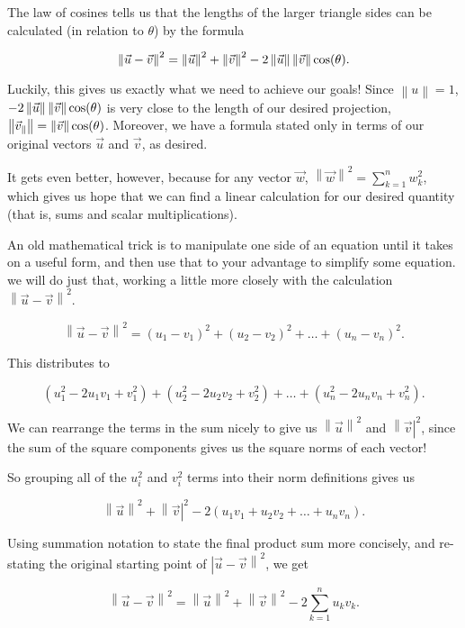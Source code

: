 \documentclass{ximera}
\begin{document}
\begin{explanation}
\begin{center}
\begin{tikzpicture}
        \end{tikzpicture}
      \end{center}
      
      The law of cosines tells us that the lengths of the larger triangle sides can be calculated (in relation to $\theta$) by the formula
      
      $$\norm{\vec{u}-\vec{v}}^2=\norm{\vec{u}}^2+\norm{\vec{v}}^2-2\norm{\vec{u}}\norm{\vec{v}}\cos(\theta).$$

      Luckily, this gives us exactly what we need to achieve our goals! Since $\left\|u\right\|=1$, $-2\norm{\vec{u}}\norm{\vec{v}}\cos(\theta)$ is very close to the length of our desired projection, $\norm{\vec{v}_\parallel}=\norm{\vec{v}}\cos(\theta)$. Moreover, we have a formula stated only in terms of our original vectors $\vec{u}$ and $\vec{v}$, as desired. 

      It gets even better, however, because for any vector $\vec{w}$, $\left\|\vec{w}\right\|^2=\sum_{k=1}^nw_k^2$, which gives us hope that we can find a linear calculation for our desired quantity (that is, sums and scalar multiplications).

      An old mathematical trick is to manipulate one side of an equation until it takes on a useful form, and then use that to your advantage to simplify some equation. we will do just that, working a little more closely with the calculation $\left\|\vec{u}-\vec{v}\right\|^2$.

      $$\left\|\vec{u}-\vec{v}\right\|^2=(u_1-v_1)^2+(u_2-v_2)^2+\ldots+(u_n-v_n)^2.$$

      This distributes to 

      $$(u_1^2-2u_1v_1+v_1^2)+(u_2^2-2u_2v_2+v_2^2)+\ldots+(u_n^2-2u_nv_n+v_n^2).$$

      We can rearrange the terms in the sum nicely to give us $\left\|\vec{u}\right\|^2$ and $\left\|\vec{v}\right|^2$, since the sum of the square components gives us the square norms of each vector!

      So grouping all of the $u_i^2$ and $v_i^2$ terms into their norm definitions gives us

      $$\left\|\vec{u}\right\|^2+\left\|\vec{v}\right|^2-2\left(u_1v_1+u_2v_2+\ldots+u_nv_n\right).$$

      Using summation notation to state the final product sum more concisely, and re-stating the original starting point of $\left|\vec{u}-\vec{v}\right\|^2$, we get

      $$\left\|\vec{u}-\vec{v}\right\|^2=\left\|\vec{u}\right\|^2+\left\|\vec{v}\right\|^2-2\sum_{k=1}^nu_kv_k.$$


\end{explanation}
\end{document}
